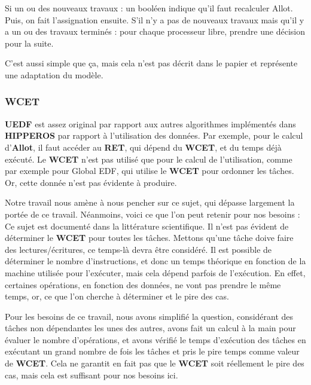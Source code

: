 		Si un ou des nouveaux travaux : un booléen indique qu'il faut recalculer Allot. Puis, 
		on fait l'assignation ensuite.
		S'il n'y a pas de nouveaux travaux mais qu'il y a un ou des travaux terminés :
		pour chaque processeur libre, prendre une décision pour la suite.\newline
		
		C'est aussi simple que ça, mais cela n'est pas décrit dans le papier et représente une 
		adaptation du modèle.
	
	
		
	\subsubsection{WCET}
		\textbf{UEDF} est assez original par rapport aux autres algorithmes implémentés dans \textbf{HIPPEROS} 
		par rapport à l'utilisation des données. Par exemple, pour le calcul d'\textbf{Allot}, il faut accéder 
		au \textbf{RET}, qui dépend du \textbf{WCET}, et du temps déjà exécuté. Le \textbf{WCET} n'est pas 
		utilisé que pour le calcul de l'utilisation, comme par exemple pour Global EDF, qui utilise 
		le \textbf{WCET }pour ordonner les tâches. Or, cette donnée n'est pas évidente à produire. \newline
		
		Notre travail nous amène à nous pencher sur ce sujet, qui dépasse largement la portée de ce travail. 
		Néanmoins, voici ce que l'on peut retenir pour nos besoins :\\
		Ce sujet est documenté dans la littérature scientifique. Il n'est pas évident de déterminer le 
		\textbf{WCET} pour toutes les tâches. Mettons qu'une tâche doive faire des lectures/écritures, 
		ce temps-là devra être considéré. Il est possible de déterminer le nombre d'instructions, 
		et donc un temps théorique en fonction de la machine utilisée pour l'exécuter, mais cela dépend 
		parfois de l'exécution. En effet, certaines opérations, en fonction des données, ne vont pas prendre 
		le même temps, or, ce que l'on cherche à déterminer et le pire des cas.\newline
	
		Pour les besoins de ce travail, nous avons simplifié la question, considérant des tâches 
		non dépendantes les unes des autres, avons fait un calcul à la main pour évaluer le 
		nombre d'opérations, et avons vérifié le temps d'exécution des tâches en exécutant un grand nombre 
		de fois les tâches et pris le pire temps comme valeur de \textbf{WCET}. Cela ne garantit en fait 
		pas que le \textbf{WCET} soit réellement le pire des cas, mais cela est suffisant pour nos besoins ici.
	
